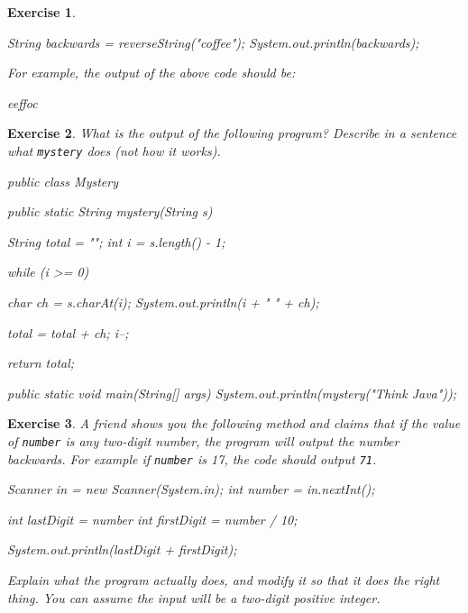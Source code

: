 \documentclass[12pt]{book}
\theoremstyle{exercise}
\newtheorem{exercise}{Exercise}[chapter]
\newcommand{\java}[1]{\verb"#1"}
\newcommand{\java}[1]{\lstinline{#1}} %
\begin{document}
\begin{exercise}
\begin{enumerate}
\begin{code}
    String backwards = reverseString("coffee");
    System.out.println(backwards);
\end{code}

For example, the output of the above code should be:

\begin{stdout}
eeffoc
\end{stdout}

\end{enumerate}

\end{exercise}


\begin{exercise}

What is the output of the following program?
Describe in a sentence what \java{mystery} does (not how it works).

\begin{code}
public class Mystery {

    public static String mystery(String s) {
        String total = "";
        int i = s.length() - 1;

        while (i >= 0) {
            char ch = s.charAt(i);
            System.out.println(i + "     " + ch);

            total = total + ch;
            i--;
        }
        return total;
    }

    public static void main(String[] args) {
        System.out.println(mystery("Think Java"));
    }

}
\end{code}

\end{exercise}


\begin{exercise}

A friend shows you the following method and claims that if the value of \java{number} is any two-digit number, the program will output the number backwards.
For example if \java{number} is 17, the code should output {\tt 71}.

\begin{code}
    Scanner in = new Scanner(System.in);
    int number = in.nextInt();

    int lastDigit = number %
    int firstDigit = number / 10;

    System.out.println(lastDigit + firstDigit);
\end{code}

Explain what the program actually does, and modify it so that it does the right thing.
You can assume the input will be a two-digit positive integer.

\end{exercise}
\end{document}
